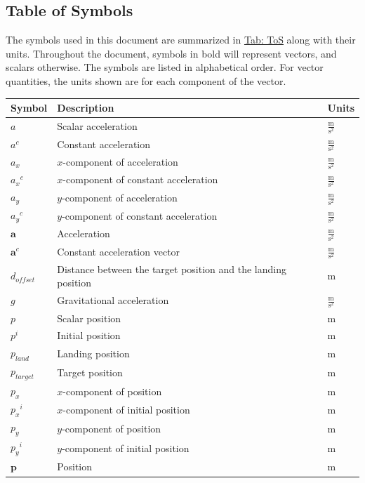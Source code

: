 \documentclass[12pt]{article}
\begin{document}
\subsection{Table of Symbols}
\label{Sec:ToS}
The symbols used in this document are summarized in \hyperref[Table:ToS]{Tab: ToS} along with their units. Throughout the document, symbols in bold will represent vectors, and scalars otherwise. The symbols are listed in alphabetical order. For vector quantities, the units shown are for each component of the vector.
\begin{longtabu}{l X[l] l}
\toprule
\textbf{Symbol} & \textbf{Description} & \textbf{Units}
\\
\midrule
\endhead
$a$ & Scalar acceleration & $\frac{\text{m}}{\text{s}^{2}}$
\\
${a^{c}}$ & Constant acceleration & $\frac{\text{m}}{\text{s}^{2}}$
\\
${a_{x}}$ & $x$-component of acceleration & $\frac{\text{m}}{\text{s}^{2}}$
\\
${{a_{x}}^{c}}$ & $x$-component of constant acceleration & $\frac{\text{m}}{\text{s}^{2}}$
\\
${a_{y}}$ & $y$-component of acceleration & $\frac{\text{m}}{\text{s}^{2}}$
\\
${{a_{y}}^{c}}$ & $y$-component of constant acceleration & $\frac{\text{m}}{\text{s}^{2}}$
\\
$\mathbf{a}$ & Acceleration & $\frac{\text{m}}{\text{s}^{2}}$
\\
${\mathbf{a}^{c}}$ & Constant acceleration vector & $\frac{\text{m}}{\text{s}^{2}}$
\\
${d_{offset}}$ & Distance between the target position and the landing position & m
\\
$g$ & Gravitational acceleration & $\frac{\text{m}}{\text{s}^{2}}$
\\
$p$ & Scalar position & m
\\
${p^{i}}$ & Initial position & m
\\
${p_{land}}$ & Landing position & m
\\
${p_{target}}$ & Target position & m
\\
${p_{x}}$ & $x$-component of position & m
\\
${{p_{x}}^{i}}$ & $x$-component of initial position & m
\\
${p_{y}}$ & $y$-component of position & m
\\
${{p_{y}}^{i}}$ & $y$-component of initial position & m
\\
$\mathbf{p}$ & Position & m

\end{longtabu}
\end{document}
